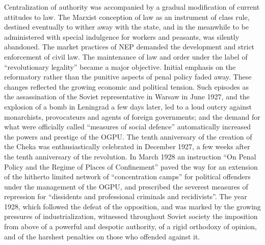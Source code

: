 Centralization of authority was accompanied by a gradual modification of current attitudes to law. The Marxist conception of law as an instrument of class rule, destined eventually to wither away with the state, and in the meanwhile to be administered with special indulgence for workers and peasants, was silently abandoned. The market practices of NEP demanded the development and strict enforcement of civil law. The maintenance of law and order under the label of ``revolutionary legality'' became a major objective. Initial emphasis on the reformatory rather than the punitive aspects of penal policy faded away. These changes reflected the growing economic and political tension. Such episodes as the assassination of the Soviet representative in Warsaw in June 1927, and the explosion of a bomb in Leningrad a few days later, led to a loud outcry against monarchists, provocateurs and agents of foreign governments; and the demand for what were officially called ``measures of social defence'' automatically increased the powers and prestige of the OGPU. The tenth anniversary of the creation of the Cheka was enthusiastically celebrated in December 1927, a few weeks after the tenth anniversary of the revolution. In March 1928 an instruction ``On Penal Policy and the Regime of Places of Confinement'' paved the way for an extension of the hitherto limited network of ``concentration camps'' for political offenders under the management of the OGPU, and prescribed the severest measures of repression for ``dissidents and professional criminals and recidivists''. The year 1928, which followed the defeat of the opposition, and was marked by the growing pressures of industrialization, witnessed throughout Soviet society the imposition from above of a powerful and despotic authority, of a rigid orthodoxy of opinion, and of the harshest penalties on those who offended against it. 
